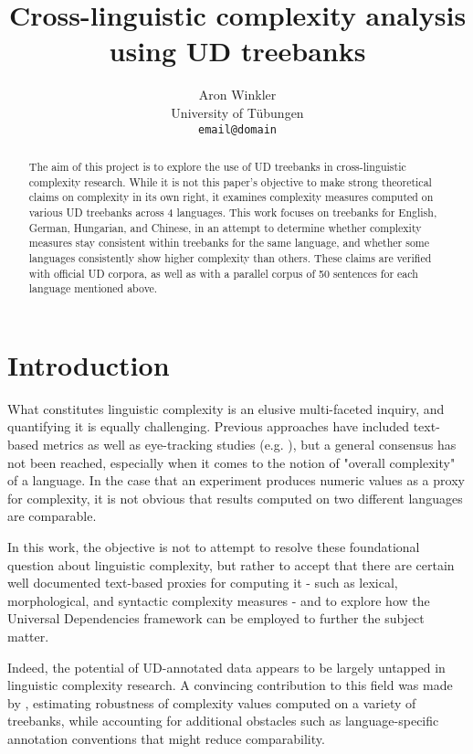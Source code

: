 \documentclass[11pt]{article}
\title{Cross-linguistic complexity analysis using UD treebanks}
\author{Aron Winkler \\
  University of Tübungen \\
  \texttt{email@domain}}
\begin{document}
\maketitle
\begin{abstract}
    The aim of this project is to explore the use of UD treebanks in cross-linguistic complexity research. While it is not this paper's objective to make strong theoretical claims on complexity in its own right, it examines complexity measures computed on various UD treebanks across 4 languages. This work focuses on treebanks for English, German, Hungarian, and Chinese, in an attempt to determine whether complexity measures stay consistent within treebanks for the same language, and whether some languages consistently show higher complexity than others.
    These claims are verified with official UD corpora, as well as with a parallel corpus of 50 sentences for each language mentioned above.
\end{abstract}

\section{Introduction}

What constitutes linguistic complexity is an elusive multi-faceted inquiry, and quantifying it is equally challenging. Previous approaches have included text-based metrics as well as eye-tracking studies (e.g. \citealp{Lee:2007}), but a general consensus has not been reached, especially when it comes to the notion of "overall complexity" of a language. In the case that an experiment produces numeric values as a proxy for complexity, it is not obvious that results computed on two different languages are comparable.

In this work, the objective is not to attempt to resolve these foundational question about linguistic complexity, but rather to accept that there are certain well documented text-based proxies for computing it - such as lexical, morphological, and syntactic complexity measures - and to explore how the Universal Dependencies framework can be employed to further the subject matter. 

Indeed, the potential of UD-annotated data appears to be largely untapped in linguistic complexity research. A convincing contribution to this field was made by \citealp{berdicevskis-etal-2018-using}, estimating robustness of complexity values computed on a variety of treebanks, while accounting for additional obstacles such as language-specific annotation conventions that might reduce comparability.
\end{document}
